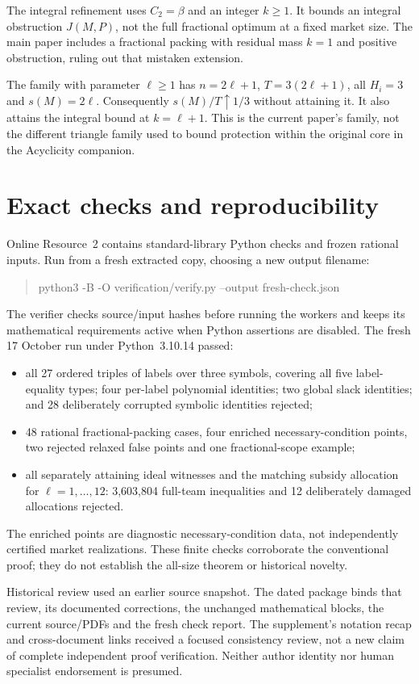 \documentclass[11pt]{article}
\theoremstyle{remark}
\begin{document}
The integral refinement uses $C_2=\beta$ and an integer $k\ge1$. It bounds
an integral obstruction $J(M,P)$, not the full fractional optimum at a fixed
market size. The main paper includes a fractional packing with residual
mass $k=1$ and positive obstruction, ruling out that mistaken extension.

The family with parameter $\ell\ge1$ has $n=2\ell+1$, $T=3(2\ell+1)$,
all $H_i=3$ and $s(M)=2\ell$. Consequently $s(M)/T\uparrow1/3$ without
attaining it. It also attains the integral bound at $k=\ell+1$.
This is the current paper's family, not the different triangle family used
to bound protection within the original core in the Acyclicity companion.

\section{Exact checks and reproducibility}
Online Resource~2 contains standard-library Python checks and frozen rational
inputs. Run from a fresh extracted copy, choosing a new output filename:
\begin{quote}\small\ttfamily
python3 -B -O verification/verify.py --output fresh-check.json
\end{quote}
The verifier checks source/input hashes before running the workers and keeps
its mathematical requirements active when Python assertions are disabled.
The fresh 17 October run under Python~3.10.14 passed:
\begin{itemize}
\item all 27 ordered triples of labels over three symbols, covering all five
label-equality types; four per-label polynomial identities; two global slack
identities; and 28 deliberately corrupted symbolic identities rejected;
\item 48 rational fractional-packing cases, four enriched necessary-condition
points, two rejected relaxed false points and one fractional-scope example;
\item all separately attaining ideal witnesses and the matching subsidy
allocation for $\ell=1,\ldots,12$: 3,603,804 full-team inequalities and
12 deliberately damaged allocations rejected.
\end{itemize}
The enriched points are diagnostic necessary-condition data, not independently
certified market realizations. These finite checks corroborate the conventional
proof; they do not establish the all-size theorem or historical novelty.

Historical review used an earlier source snapshot. The dated package binds
that review, its documented corrections, the unchanged mathematical blocks,
the current source/PDFs and the fresh check report. The supplement's notation
recap and cross-document links received a focused consistency review, not a
new claim of complete independent proof verification. Neither author identity
nor human specialist endorsement is presumed.
\end{document}
